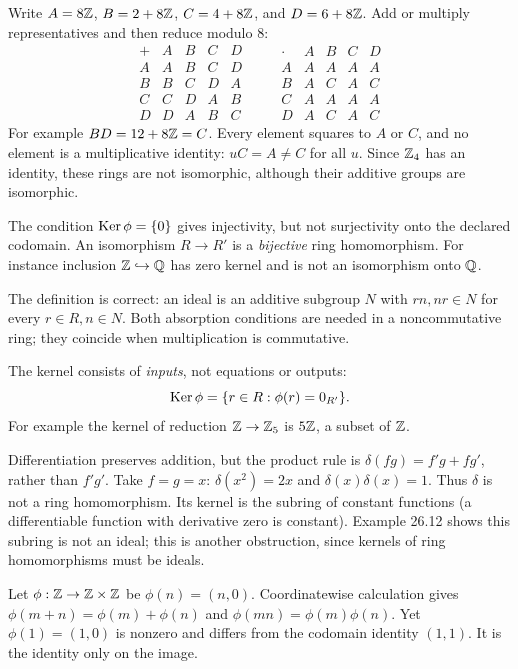 Write $A=8\mathbb{Z}$, $B=2+8\mathbb{Z}$, $C=4+8\mathbb{Z}$, and $D=6+8\mathbb{Z}$. Add or multiply representatives and then reduce modulo $8$:
\[
\begin{array}{c|cccc}+&A&B&C&D\\\hline A&A&B&C&D\\B&B&C&D&A\\C&C&D&A&B\\D&D&A&B&C\end{array}
\qquad
\begin{array}{c|cccc}\cdot&A&B&C&D\\\hline A&A&A&A&A\\B&A&C&A&C\\C&A&A&A&A\\D&A&C&A&C\end{array}
\]
For example $BD=12+8\mathbb{Z}=C$. Every element squares to $A$ or $C$, and no element is a multiplicative identity: $uC=A\ne C$ for all $u$. Since $\mathbb{Z}_4$ has an identity, these rings are not isomorphic, although their additive groups are isomorphic.

The condition $\operatorname{Ker}\phi=\{0\}$ gives injectivity, but not surjectivity onto the declared codomain. An isomorphism $R\to R'$ is a \emph{bijective} ring homomorphism. For instance inclusion $\mathbb{Z}\hookrightarrow\mathbb{Q}$ has zero kernel and is not an isomorphism onto $\mathbb{Q}$.

The definition is correct: an ideal is an additive subgroup $N$ with $rn,nr\in N$ for every $r\in R,n\in N$. Both absorption conditions are needed in a noncommutative ring; they coincide when multiplication is commutative.

The kernel consists of \emph{inputs}, not equations or outputs:
\[\operatorname{Ker}\phi=\{r\in R:\phi(r)=0_{R'}\}.\]
For example the kernel of reduction $\mathbb{Z}\to\mathbb{Z}_5$ is $5\mathbb{Z}$, a subset of $\mathbb{Z}$.

Differentiation preserves addition, but the product rule is $\delta(fg)=f'g+fg'$, rather than $f'g'$. Take $f=g=x$: $\delta(x^2)=2x$ and $\delta(x)\delta(x)=1$. Thus $\delta$ is not a ring homomorphism.
Its kernel is the subring of constant functions (a differentiable function with derivative zero is constant). Example 26.12 shows this subring is not an ideal; this is another obstruction, since kernels of ring homomorphisms must be ideals.

Let $\phi:\mathbb{Z}\to\mathbb{Z}\times\mathbb{Z}$ be $\phi(n)=(n,0)$. Coordinatewise calculation gives $\phi(m+n)=\phi(m)+\phi(n)$ and $\phi(mn)=\phi(m)\phi(n)$. Yet $\phi(1)=(1,0)$ is nonzero and differs from the codomain identity $(1,1)$. It is the identity only on the image.

